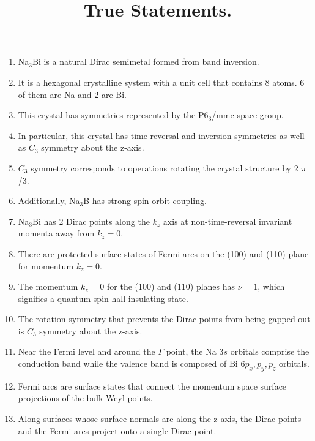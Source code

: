 \documentclass[english]{article}
\begin{document}
\title{True Statements.}
\maketitle

\begin{enumerate}
    \item Na$_3$Bi is a natural Dirac semimetal formed from band inversion.
    
    \item It is a hexagonal crystalline system with a unit cell that contains 8 atoms. 6 of them are Na and 2 are Bi.
    
    \item This crystal has symmetries represented by the P$6_3$/mmc space group.  
    
    \item In particular, this crystal has time-reversal and inversion symmetries as well as $C_3$ symmetry about the z-axis. 
    
    \item $C_3$ symmetry corresponds to operations rotating the crystal structure by 2 $\pi$/3.
        
    \item Additionally, Na$_3$B has strong spin-orbit coupling.
    
    \item Na$_3$Bi has 2 Dirac points along the $k_z$ axis at non-time-reversal invariant momenta away from $k_z = 0$.
    
    \item There are protected surface states of Fermi arcs on the (100) and (110) plane for momentum $k_z = 0$.  
    
    \item The momentum $k_z = 0$ for the (100) and (110) planes has $\nu = 1$, which signifies a quantum spin hall insulating state.  
    
    \item The rotation symmetry that prevents the Dirac points from being gapped out is $C_3$ symmetry about the z-axis.
    
    \item Near the Fermi level and around the $\Gamma$ point, the Na $3s$ orbitals comprise the conduction band while the valence band is composed of Bi $6p_x,p_y,p_z$ orbitals.
    
    \item Fermi arcs are surface states that connect the momentum space surface projections of the bulk Weyl points. 
    
    \item Along surfaces whose surface normals are along the z-axis, the Dirac points and the Fermi arcs project onto a single Dirac point.
    
\end{enumerate}
\end{document}
